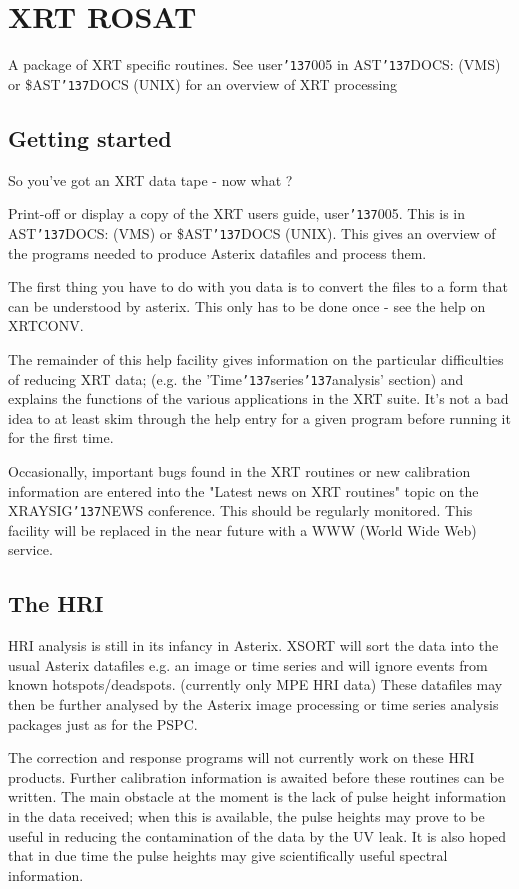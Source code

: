 \documentclass{book}
\renewcommand{\_}{{\tt\char'137}}     %
\begin{document}
\section{XRT ROSAT}
A package of XRT specific routines. See user\_005 in AST\_DOCS:
(VMS) or \$AST\_DOCS (UNIX) for an overview of XRT processing
\subsection{Getting started}
So you've got an XRT data tape - now what ?

Print-off or display a copy of the XRT users guide, user\_005. This
is in AST\_DOCS: (VMS) or \$AST\_DOCS (UNIX). This gives an
overview of the programs needed to produce Asterix datafiles and process
them.

The first thing you have to do with you data is to convert the files to a form
that can be understood by asterix. This only has to be done once - see the
help on XRTCONV.

The remainder of this help facility gives information on the particular
difficulties of reducing XRT data; (e.g. the 'Time\_series\_analysis' section)
and explains the functions of the various applications in the XRT suite.
It's not a bad idea to at least skim through the help entry for a given
program before running it for the first time.

Occasionally, important bugs found in the XRT routines or new calibration
information are entered into the "Latest news on XRT routines" topic
on the XRAYSIG\_NEWS conference. This should be regularly monitored.
This facility will be replaced in the near future with a WWW (World Wide
Web) service.

\subsection{The HRI}
HRI analysis is still in its infancy in Asterix. XSORT will sort the
data into the usual Asterix datafiles e.g. an image or time series
and will ignore events from known hotspots/deadspots. (currently only
MPE HRI data) These datafiles may then be further analysed by the
Asterix image processing or time series analysis packages just as for
the PSPC.

The correction and response programs will not currently
work on these HRI products. Further calibration information is awaited
before these routines can be written. The main obstacle at the moment
is the lack of pulse height information in the data received; when this
is available, the pulse heights may prove to be useful in reducing the
contamination of the data by the UV leak. It is also hoped that in due
time the pulse heights may give scientifically useful spectral
information.
\end{document}

